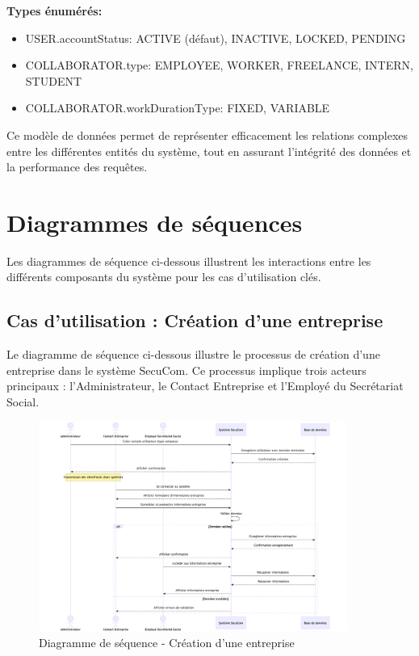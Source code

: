 \textbf{Types énumérés:}
\begin{itemize}
  \item USER.accountStatus: ACTIVE (défaut), INACTIVE, LOCKED, PENDING
  \item COLLABORATOR.type: EMPLOYEE, WORKER, FREELANCE, INTERN, STUDENT
  \item COLLABORATOR.workDurationType: FIXED, VARIABLE
\end{itemize}

Ce modèle de données permet de représenter efficacement les relations complexes entre les différentes entités du système, tout en assurant l'intégrité des données et la performance des requêtes.

\section{Diagrammes de séquences}

Les diagrammes de séquence ci-dessous illustrent les interactions entre les différents composants du système pour les cas d'utilisation clés.

\subsection{Cas d'utilisation : Création d'une entreprise}

Le diagramme de séquence ci-dessous illustre le processus de création d'une entreprise dans le système SecuCom. Ce processus implique trois acteurs principaux : l'Administrateur, le Contact Entreprise et l'Employé du Secrétariat Social.

\begin{figure}[h]
\centering
\includegraphics[width=0.9\textwidth]{SD_creation_entreprise.png}
\caption{Diagramme de séquence - Création d'une entreprise}
\end{figure}

